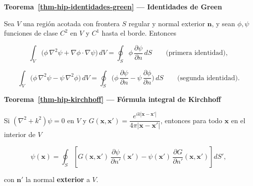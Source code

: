 \documentclass[
  spanish,
  a4paper,
]{scrbook}
\theoremstyle{definition}
\theoremstyle{plain}
\theoremstyle{definition}
\theoremstyle{plain}
\theoremstyle{definition}
\theoremstyle{remark}
\begin{document}
\begin{tcolorbox}[enhanced jigsaw, arc=.35mm, bottomrule=.15mm, breakable, colback=white, colframe=quarto-callout-note-color-frame, left=2mm, leftrule=.75mm, opacityback=0, rightrule=.15mm, toprule=.15mm]
\begin{minipage}[t]{5.5mm}
\textcolor{quarto-callout-note-color}{\faInfo}
\end{minipage}%
\begin{minipage}[t]{\textwidth - 5.5mm}

\vspace{-3mm}\textbf{Teorema~\ref{thm-hip-identidades-green} --- Identidades de Green}\vspace{3mm}

Sea \(V\) una región acotada con frontera \(S\) regular y normal
exterior \(\mathbf n\), y sean \(\phi,\psi\) funciones de clase \(C^2\)
en \(V\) y \(C^1\) hasta el borde. Entonces

\[
\int_V\big(\phi\,\nabla^2\psi + \nabla\phi\cdot\nabla\psi\big)\,dV = \oint_S\phi\,\frac{\partial\psi}{\partial n}\,dS
\qquad\text{(primera identidad)},
\]

\[
\int_V\big(\phi\,\nabla^2\psi - \psi\,\nabla^2\phi\big)\,dV = \oint_S\Big(\phi\,\frac{\partial\psi}{\partial n} - \psi\,\frac{\partial\phi}{\partial n}\Big)\,dS
\qquad\text{(segunda identidad)}.
\]

\end{minipage}%
\end{tcolorbox}

\begin{tcolorbox}[enhanced jigsaw, arc=.35mm, bottomrule=.15mm, breakable, colback=white, colframe=quarto-callout-note-color-frame, left=2mm, leftrule=.75mm, opacityback=0, rightrule=.15mm, toprule=.15mm]
\begin{minipage}[t]{5.5mm}
\textcolor{quarto-callout-note-color}{\faInfo}
\end{minipage}%
\begin{minipage}[t]{\textwidth - 5.5mm}

\vspace{-3mm}\textbf{Teorema~\ref{thm-hip-kirchhoff} --- Fórmula integral de Kirchhoff}\vspace{3mm}

Si \((\nabla^2+k^2)\psi = 0\) en \(V\) y
\(G(\mathbf x,\mathbf x') = \dfrac{e^{ik|\mathbf x-\mathbf x'|}}{4\pi|\mathbf x-\mathbf x'|}\),
entonces para todo \(\mathbf x\) en el interior de \(V\)

\[
\psi(\mathbf x) = \oint_S\left[G(\mathbf x,\mathbf x')\,\frac{\partial\psi}{\partial n'}(\mathbf x') - \psi(\mathbf x')\,\frac{\partial G}{\partial n'}(\mathbf x,\mathbf x')\right]dS',
\]

con \(\mathbf n'\) la normal \textbf{exterior} a \(V\).

\end{minipage}%
\end{tcolorbox}
\end{document}
